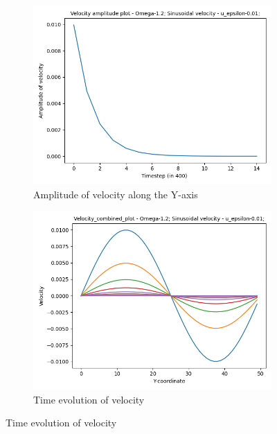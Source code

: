 \documentclass[a4paper,11pt]{report}
\begin{document}
\begin{figure}[h!]
  \begin{subfigure}{0.3\textwidth}
        \includegraphics[width=\linewidth]{HPC_report/images/shear_wave_decay/sinusoidal_velocity/Amplitude-Timestep (in 400) -Amplitude of velocity.png}
        \captionsetup{font=small}
        \caption{Amplitude of velocity along the Y-axis}
    \end{subfigure}
    \begin{subfigure}{0.3\textwidth}
        \includegraphics[width=\linewidth]{HPC_report/images/shear_wave_decay/sinusoidal_velocity/Combined_plot-Y-coordinate-Velocity.png}
        \captionsetup{font=small}
        \caption{Time evolution of velocity}
    \end{subfigure}

\end{figure}
\end{document}
